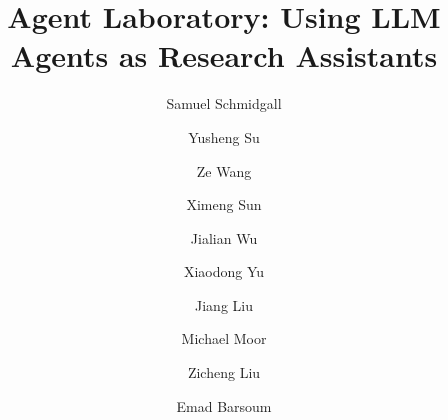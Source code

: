\documentclass[11pt, a4paper]{gdm_format}
\title{Agent Laboratory: Using LLM Agents as Research Assistants}
\author[1, 2]{Samuel Schmidgall}
\author[1]{Yusheng Su}
\author[1]{Ze Wang}
\author[1]{Ximeng Sun}
\author[1]{Jialian Wu}
\author[1]{Xiaodong Yu}
\author[1]{Jiang Liu}
\author[3]{Michael Moor}
\author[1]{Zicheng Liu}
\author[1]{Emad Barsoum}
\affil[1]{AMD}
\affil[2]{Johns Hopkins University}
\affil[3]{ETH Zurich}
\begin{document}
\begin{abstract}






\end{abstract}
\end{document}
